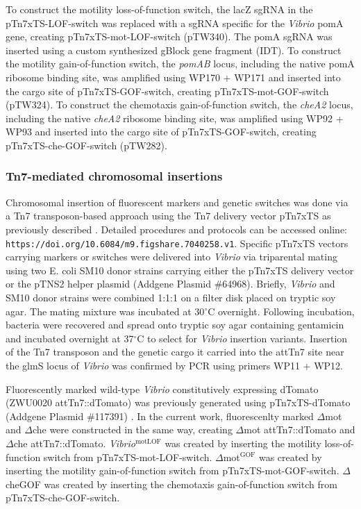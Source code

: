 {{{{{{{To construct the motility loss-of-function switch, the lacZ sgRNA in the pTn7xTS-LOF-switch was replaced with a sgRNA specific for the \textit{Vibrio} pomA gene, creating pTn7xTS-mot-LOF-switch (pTW340). The pomA sgRNA was inserted using a custom synthesized gBlock gene fragment (IDT). To construct the motility gain-of-function switch, the \textit{pomAB} locus, including the native pomA ribosome binding site, was amplified using WP170 + WP171 and inserted into the cargo site of pTn7xTS-GOF-switch, creating pTn7xTS-mot-GOF-switch (pTW324). To construct the chemotaxis gain-of-function switch, the \textit{cheA2} locus, including the native \textit{cheA2} ribosome binding site, was amplified using WP92 + WP93 and inserted into the cargo site of pTn7xTS-GOF-switch, creating pTn7xTS-che-GOF-switch (pTW282).

\subsubsection{Tn7-mediated chromosomal insertions}
Chromosomal insertion of fluorescent markers and genetic switches was done via a Tn7 transposon-based approach using the Tn7 delivery vector pTn7xTS as previously described \cite{wiles_modernized_2018}. Detailed procedures and protocols can be accessed online: \texttt{https://doi.org/10.6084/m9.figshare.7040258.v1}. Specific pTn7xTS vectors carrying markers or switches were delivered into \textit{Vibrio} via triparental mating using two E. coli SM10 donor strains carrying either the pTn7xTS delivery vector or the pTNS2 helper plasmid (Addgene Plasmid \#64968). Briefly, \textit{Vibrio} and SM10 donor strains were combined 1:1:1 on a filter disk placed on tryptic soy agar. The mating mixture was incubated at 30$^\circ$C overnight. Following incubation, bacteria were recovered and spread onto tryptic soy agar containing gentamicin and incubated overnight at 37$^\circ$C to select for \textit{Vibrio} insertion variants. Insertion of the Tn7 transposon and the genetic cargo it carried into the attTn7 site near the glmS locus of \textit{Vibrio} was confirmed by PCR using primers WP11 + WP12.

Fluorescently marked wild-type \textit{Vibrio} constitutively expressing dTomato (ZWU0020 attTn7::dTomato) was previously generated using pTn7xTS-dTomato (Addgene Plasmid \#117391) \cite{wiles_modernized_2018}. In the current work, fluorescenlty marked $\Delta$mot and $\Delta$che were constructed in the same way, creating $\Delta$mot attTn7::dTomato  and $\Delta$che attTn7::dTomato. \textit{Vibrio}$^{\text{motLOF}}$ was created by inserting the motility loss-of-function switch from pTn7xTS-mot-LOF-switch. $\Delta$mot$^{\text{GOF}}$ was created by inserting the motility gain-of-function switch from pTn7xTS-mot-GOF-switch. $\Delta$cheGOF was created by inserting the chemotaxis gain-of-function switch from pTn7xTS-che-GOF-switch.

}}}}}}}
